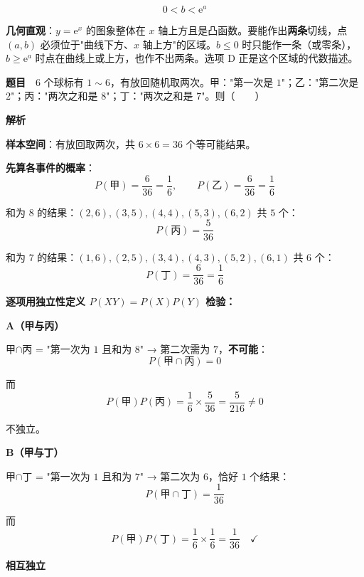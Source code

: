 \[0<b<\mathrm e^{a}\]


\begin{gktip}
\textbf{几何直观}：$y=\mathrm e^{x}$ 的图象整体在 $x$ 轴上方且是凸函数。要能作出\textbf{两条}切线，点 $(a,b)$ 必须位于"曲线下方、$x$ 轴上方"的区域。$b\le0$ 时只能作一条（或零条），$b\ge\mathrm e^{a}$ 时点在曲线上或上方，也作不出两条。选项 D 正是这个区域的代数描述。
\end{gktip}

\par\medskip


\textbf{题目}　$6$ 个球标有 $1\sim6$，有放回随机取两次。甲："第一次是 $1$"；乙："第二次是 $2$"；丙："两次之和是 $8$"；丁："两次之和是 $7$"。则（　　）

\textbf{解析}

\textbf{样本空间}：有放回取两次，共 $6\times6=36$ 个等可能结果。

\textbf{先算各事件的概率}：
\[P(\text{甲})=\frac6{36}=\frac16,\qquad P(\text{乙})=\frac6{36}=\frac16\]

和为 $8$ 的结果：$(2,6),(3,5),(4,4),(5,3),(6,2)$ 共 $5$ 个：
\[P(\text{丙})=\frac5{36}\]

和为 $7$ 的结果：$(1,6),(2,5),(3,4),(4,3),(5,2),(6,1)$ 共 $6$ 个：
\[P(\text{丁})=\frac6{36}=\frac16\]

\textbf{逐项用独立性定义 $P(XY)=P(X)P(Y)$ 检验：}

\par\medskip

\textbf{A（甲与丙）}

甲$\cap$丙 = "第一次为 $1$ 且和为 $8$" → 第二次需为 $7$，\textbf{不可能}：
\[P(\text{甲}\cap\text{丙})=0\]

而
\[P(\text{甲})P(\text{丙})=\frac16\times\frac5{36}=\frac5{216}\ne0\]

不独立。

\par\medskip

\textbf{B（甲与丁）}

甲$\cap$丁 = "第一次为 $1$ 且和为 $7$" → 第二次为 $6$，恰好 $1$ 个结果：
\[P(\text{甲}\cap\text{丁})=\frac1{36}\]

而
\[P(\text{甲})P(\text{丁})=\frac16\times\frac16=\frac1{36}\quad\checkmark\]

\textbf{相互独立} 

\par\medskip

